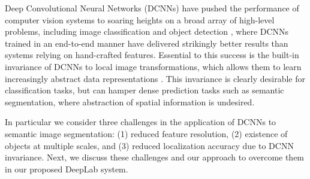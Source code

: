 \documentclass[10pt,journal,compsoc]{IEEEtran}
\begin{document}
\maketitle


\IEEEdisplaynontitleabstractindextext


\IEEEpeerreviewmaketitle













Deep Convolutional Neural Networks (DCNNs) \cite{LeCun1998} have 
pushed the performance of computer vision systems to soaring heights on a
broad array of high-level problems, including image classification
\cite{KrizhevskyNIPS2013, sermanet2013overfeat, simonyan2014very,
  szegedy2014going, papandreou2014untangling} and object detection
\cite{girshick2014rcnn, erhan2014scalable, girshick2015fast, ren2015faster,
  he2015deep, liu2015ssd}, where DCNNs trained
in an end-to-end manner have delivered strikingly better results than systems relying
on hand-crafted features.
Essential to this success is the built-in invariance of DCNNs
to local image transformations, which allows them to learn increasingly
 abstract data representations \cite{zeiler2014visualizing}. This
invariance is clearly desirable for classification tasks, but can hamper
dense prediction tasks such as semantic segmentation, where abstraction of spatial
information is undesired.

In particular we consider three challenges in the application of DCNNs to semantic image segmentation: (1) reduced feature resolution,
(2) existence of objects at multiple scales, and (3) reduced localization
accuracy due to DCNN invariance. Next, we discuss these challenges and our
approach to overcome them in our proposed DeepLab system.
\end{document}
